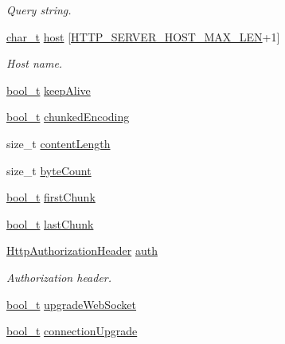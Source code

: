 \begin{DoxyCompactItemize}
\begin{DoxyCompactList}\small\item\em Query string. \end{DoxyCompactList}\item 
\hyperlink{compiler__port_8h_a40bb5262bf908c328fbcfbe5d29d0201}{char\+\_\+t} \hyperlink{structHttpRequest_a883daf02294a853d0e2e4c0169576ec1}{host} \mbox{[}\hyperlink{http__server_8h_a69b97c891333388e6ed2ff330fd9aa94}{H\+T\+T\+P\+\_\+\+S\+E\+R\+V\+E\+R\+\_\+\+H\+O\+S\+T\+\_\+\+M\+A\+X\+\_\+\+L\+EN}+1\mbox{]}
\begin{DoxyCompactList}\small\item\em Host name. \end{DoxyCompactList}\item 
\hyperlink{compiler__port_8h_a812d16e5494522586b3784e55d479912}{bool\+\_\+t} \hyperlink{structHttpRequest_ac436a62d3c0ae60ce7a1219a3c7c2b02}{keep\+Alive}
\item 
\hyperlink{compiler__port_8h_a812d16e5494522586b3784e55d479912}{bool\+\_\+t} \hyperlink{structHttpRequest_a727477dfc2e10a7f8b0a8171dae8d429}{chunked\+Encoding}
\item 
size\+\_\+t \hyperlink{structHttpRequest_a0fb3be585ceb9a1a41a2398c86361061}{content\+Length}
\item 
size\+\_\+t \hyperlink{structHttpRequest_a67315b0475e5b5b12586f549ad715fce}{byte\+Count}
\item 
\hyperlink{compiler__port_8h_a812d16e5494522586b3784e55d479912}{bool\+\_\+t} \hyperlink{structHttpRequest_a6919525cf5fbc4de85306b2a76ba9066}{first\+Chunk}
\item 
\hyperlink{compiler__port_8h_a812d16e5494522586b3784e55d479912}{bool\+\_\+t} \hyperlink{structHttpRequest_a71a982c510e85e91e7bfe9bf6d38b694}{last\+Chunk}
\item 
\hyperlink{structHttpAuthorizationHeader}{Http\+Authorization\+Header} \hyperlink{structHttpRequest_a133573b21cfeec11680e82cce5d2c551}{auth}
\begin{DoxyCompactList}\small\item\em Authorization header. \end{DoxyCompactList}\item 
\hyperlink{compiler__port_8h_a812d16e5494522586b3784e55d479912}{bool\+\_\+t} \hyperlink{structHttpRequest_ab11c6dedab0273a26fc5f50c8ebea434}{upgrade\+Web\+Socket}
\item 
\hyperlink{compiler__port_8h_a812d16e5494522586b3784e55d479912}{bool\+\_\+t} \hyperlink{structHttpRequest_a0d4325a4f6a122d19a92213c8b9f9ce4}{connection\+Upgrade}

\end{DoxyCompactItemize}
